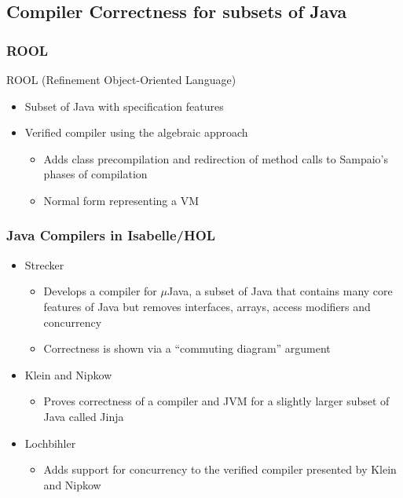 \documentclass{beamer}
\newcommand{\footmake}[1]{
\ifthenelse{\equal{#1}{}}%
	{}%
	{\footnotetext{#1}}%
}
\newenvironment{slide}[2][fragile,environment=slide]
{\begin{frame}[#1]
	\frametitle{#2}\begin{refsegment}}
{\footmake{\printbibliography[segment=\therefsegment]}\end{refsegment}\end{frame}}
\begin{document}
\subsection{Compiler Correctness for subsets of Java}

\begin{slide}{ROOL}
ROOL (Refinement Object-Oriented Language)\cite{cavalcanti2000}
\begin{itemize}
\item Subset of Java with specification features
\item Verified compiler using the algebraic approach\cite{duran2005, duran2010}
  \begin{itemize}
  \item Adds class precompilation and redirection of method calls to
Sampaio’s phases of compilation
  \item Normal form representing a VM
  \end{itemize}
\end{itemize}
\end{slide}

\begin{slide}{Java Compilers in Isabelle/HOL}
  \begin{itemize}
  \item Strecker\cite{strecker2002}
    \begin{itemize}
    \item Develops a compiler for $\mu$Java, a subset of Java that contains many core features of Java but removes interfaces, arrays, access modifiers and concurrency
    \item Correctness is shown via a ``commuting diagram'' argument
    \end{itemize}
  \item Klein and Nipkow\cite{klein2006}
    \begin{itemize}
    \item Proves correctness of a compiler and JVM for a slightly larger subset of Java called Jinja
    \end{itemize}
  \item Lochbihler\cite{lochbihler2010}
    \begin{itemize}
    \item Adds support for concurrency to the verified compiler presented by Klein and Nipkow
    \end{itemize}
  \end{itemize}
\end{slide}
\end{document}
